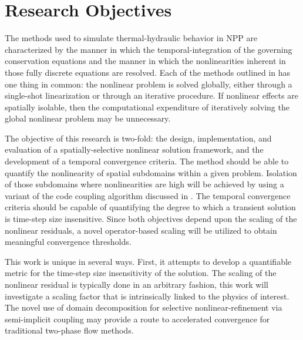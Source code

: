 \section{Research Objectives}
The methods used to simulate thermal-hydraulic behavior in NPP are characterized by the manner in which the temporal-integration of the governing conservation equations and the manner in which the nonlinearities inherent in those fully discrete equations are resolved.
Each of the methods outlined in  has one thing in common: the nonlinear problem is solved globally, either through a single-shot linearization or through an iterative procedure.
If nonlinear effects are spatially isolable, then the computational expenditure of iteratively solving the global nonlinear problem may be unnecessary.

The objective of this research is two-fold: the design, implementation, and evaluation of a spatially-selective nonlinear solution framework, and the development of a temporal convergence criteria.
The method should be able to quantify the nonlinearity of spatial subdomains within a given problem.
Isolation of those subdomains where nonlinearities are high will be achieved by using a variant of the code coupling algorithm discussed in .
The temporal convergence criteria should be capable of quantifying the degree to which a transient solution is time-step size insensitive.
Since both objectives depend upon the scaling of the nonlinear residuals, a novel operator-based scaling will be utilized to obtain meaningful convergence thresholds.

This work is unique in several ways.
First, it attempts to develop a quantifiable metric for the time-step size insensitivity of the solution.
The scaling of the nonlinear residual is typically done in an arbitrary fashion, this work will investigate a scaling factor that is intrinsically linked to the physics of interest.
The novel use of domain decomposition for selective nonlinear-refinement via semi-implicit coupling may provide a route to accelerated convergence for traditional two-phase flow methods.
